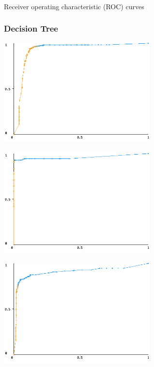 \documentclass[12pt]{article}
\begin{document}
\begin{section}{Receiver operating characteristic (ROC) curves}
 \subsubsection{Decision Tree}

 \begin{center}
     \begin{minipage}{0.48\linewidth}
         \includegraphics[width=8cm]{images/3_1_decision_tree_normal.png}
     \end{minipage}
     \begin{minipage}{0.48\linewidth}
         \includegraphics[width=8cm]{images/3_1_decision_tree_pathological.png}
     \end{minipage}
     \begin{minipage}{0.48\linewidth}
         \includegraphics[width=8cm]{images/3_1_decision_tree_suspect.png}
     \end{minipage}
 \end{center}


\end{section}
\end{document}
